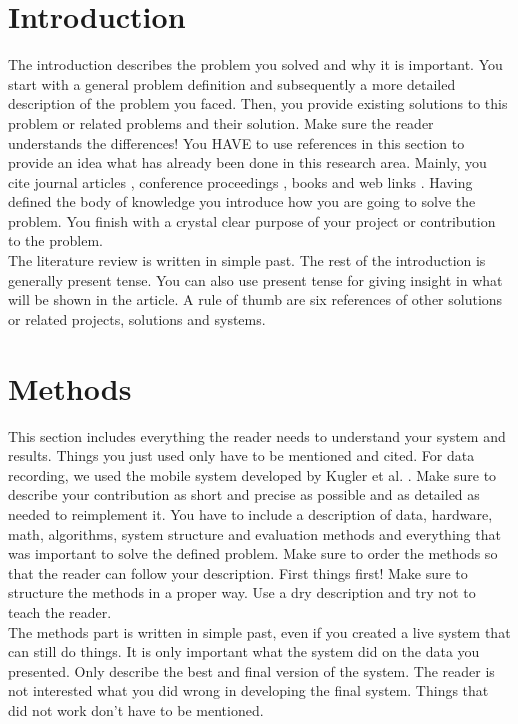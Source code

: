 \documentclass[conference]{IEEEtran}
\begin{document}
\section{Introduction}
The introduction describes the problem you solved and why it is important. You start with a general problem definition and subsequently a more detailed description of the problem you faced. Then, you provide existing solutions to this problem or related problems and their solution. Make sure the reader understands the differences! You HAVE to use references in this section to provide an idea what has already been done in this research area. Mainly, you cite journal articles \cite{JournalArticle}, conference proceedings \cite{ProceedingsArticle}, books \cite{Book} and web links \cite{Weblink}. Having defined the body of knowledge you introduce how you are going to solve the problem. You finish with a crystal clear purpose of your project or contribution to the problem.\\
The literature review is written in simple past. The rest of the introduction is generally present tense. You can also use present tense for giving insight in what will be shown in the article. A rule of thumb are six references of other solutions or related projects, solutions and systems.  

\section{Methods}
This section includes everything the reader needs to understand your system and results. Things you just used only have to be mentioned and cited. For data recording, we used the mobile system developed by Kugler et al. \cite{ProceedingsArticle}. Make sure to describe your contribution as short and precise as possible and as detailed as needed to reimplement it. You have to include a description of data, hardware, math, algorithms, system structure and evaluation methods and everything that was important to solve the defined problem. Make sure to order the methods so that the reader can follow your description. First things first! Make sure to structure the methods in a proper way. Use a dry description and try not to teach the reader. \\
The methods part is written in simple past, even if you created a live system that can still do things. It is only important what the system did on the data you presented. Only describe the best and final version of the system. The reader is not interested what you did wrong in developing the final system. Things that did not work don't have to be mentioned.
\end{document}
